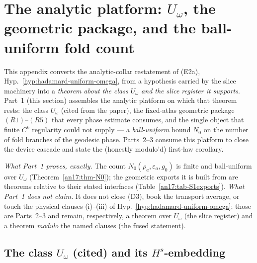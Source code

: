 
\renewcommand{\thesection}{E2a}%
\section{The analytic platform: \texorpdfstring{$U_\omega$}{U-omega}, the
geometric package, and the ball-uniform fold count}
\label{an17:sec-platform}%
\label{sec:an17-appendix}%

This appendix converts the analytic-collar restatement of (E2a),
Hyp.~\ref{hyp:hadamard-uniform-omega}, from a hypothesis carried by the slice
machinery into a \emph{theorem about the class $U_\omega$ and the slice
register it supports}. Part~1 (this section) assembles the analytic platform on
which that theorem rests: the class $U_\omega$ (cited from the paper), the
fixed-atlas geometric package $(R1)$--$(R5)$ that every phase estimate consumes,
and the single object that finite $C^k$ regularity could not supply --- a
\emph{ball-uniform} bound $N_0$ on the number of fold branches of the geodesic
phase. Parts~2--3 consume this platform to close the device cascade and state
the (honestly modulo'd) first-law corollary.

\emph{What Part~1 proves, exactly.} The count $N_0(\rho_a,\varepsilon_a,g_0)$ is
finite and ball-uniform over $U_\omega$ (Theorem~\ref{an17:thm-N0}); the
geometric exports it is built from are theorems relative to their stated
interfaces (Table~\ref{an17:tab-S1exports}). \emph{What Part~1 does not claim.}
It does not close (D3), book the transport average, or touch the physical
clauses (i)--(iii) of Hyp.~\ref{hyp:hadamard-uniform-omega}; those are Parts~2--3
and remain, respectively, a theorem over $U_\omega$ (the slice register) and a
theorem \emph{modulo} the named clauses (the fused statement).

\subsection{The class \texorpdfstring{$U_\omega$}{U-omega} (cited) and its
\texorpdfstring{$H^s$}{H-s}-embedding}
\label{an17:sub-Uomega}%
\label{an17:def-Uomega}%
\label{def:an-Uomega}%

